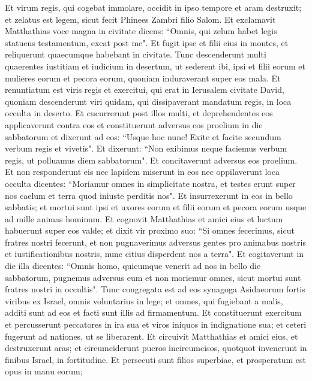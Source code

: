 \begin{biblechapter}
\verse Et virum regis, qui cogebat immolare, occidit in ipso tempore et aram destruxit; 
\verse et zelatus est legem, sicut fecit Phinees Zambri filio Salom. 
\verse Et exclamavit Matthathias voce magna in civitate dicens: “Omnis, qui zelum habet legis statuens testamentum, exeat post me". 
\verse Et fugit ipse et filii eius in montes, et reliquerunt quaecumque habebant in civitate. 
\verse Tunc descenderunt multi quaerentes iustitiam et iudicium in desertum, ut sederent ibi, 
\verse ipsi et filii eorum et mulieres eorum et pecora eorum, quoniam induraverant super eos mala. 
\verse Et renuntiatum est viris regis et exercitui, qui erat in Ierusalem civitate David, quoniam descenderunt viri quidam, qui dissipaverant mandatum regis, in loca occulta in deserto. 
\verse Et cucurrerunt post illos multi, et deprehendentes eos applicaverunt contra eos et constituerunt adversus eos proelium in die sabbatorum 
\verse et dixerunt ad eos: “Usque hoc nunc! Exite et facite secundum verbum regis et vivetis". 
\verse Et dixerunt: “Non exibimus neque faciemus verbum regis, ut polluamus diem sabbatorum". 
\verse Et concitaverunt adversus eos proelium. 
\verse Et non responderunt eis nec lapidem miserunt in eos nec oppilaverunt loca occulta 
\verse dicentes: “Moriamur omnes in simplicitate nostra, et testes erunt super nos caelum et terra quod iniuste perditis nos". 
\verse Et insurrexerunt in eos in bello sabbatis; et mortui sunt ipsi et uxores eorum et filii eorum et pecora eorum usque ad mille animas hominum. 
\verse Et cognovit Matthathias et amici eius et luctum habuerunt super eos valde;  
\verse et dixit vir proximo suo: “Si omnes fecerimus, sicut fratres nostri fecerunt, et non pugnaverimus adversus gentes pro animabus nostris et iustificationibus nostris, nunc citius disperdent nos a terra". 
\verse Et cogitaverunt in die illa dicentes: “Omnis homo, quicumque venerit ad nos in bello die sabbatorum, pugnemus adversus eum et non moriemur omnes, sicut mortui sunt fratres nostri in occultis". 
\verse Tunc congregata est ad eos synagoga Asidaeorum fortis viribus ex Israel, omnis voluntarius in lege; 
\verse et omnes, qui fugiebant a malis, additi sunt ad eos et facti sunt illis ad firmamentum.  
\verse Et constituerunt exercitum et percusserunt peccatores in ira sua et viros iniquos in indignatione sua; et ceteri fugerunt ad nationes, ut se liberarent.  
\verse Et circuivit Matthathias et amici eius, et destruxerunt aras; 
\verse et circumciderunt pueros incircumcisos, quotquot invenerunt in finibus Israel, in fortitudine. 
\verse Et persecuti sunt filios superbiae, et prosperatum est opus in manu eorum; 

\end{biblechapter}
